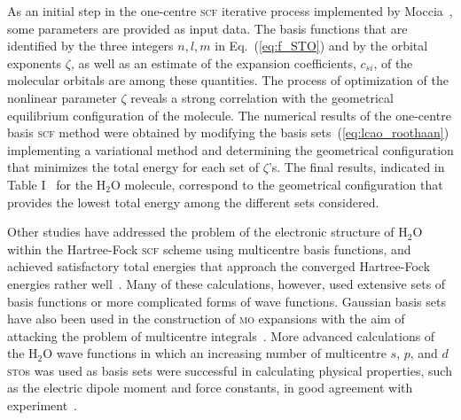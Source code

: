 
As an initial step in the one-centre \textsc{scf} iterative process
implemented by
Moccia~\cite{Moccia_JCP_2164,Moccia_JCP_2176,Moccia_1964}, some
parameters are provided as input data. The basis functions that are
identified by the three integers $n,l,m$ in Eq.~(\ref{eq:f_STO}) and
by the orbital exponents $\zeta$, as well as an estimate of the
expansion coefficients, $c_{si}$, of the molecular orbitals are among
these quantities. The process of optimization of the nonlinear
parameter $\zeta$ reveals a strong correlation with the geometrical
equilibrium configuration of the molecule. The numerical results of
the one-centre basis \textsc{scf} method were obtained by modifying
the basis sets~(\ref{eq:lcao_roothaan}) implementing a variational
method and determining the geometrical configuration that minimizes
the total energy for each set of $\zeta$'s. The final results,
indicated in Table I~\cite{Moccia_1964} for the H$_{2}$O molecule,
correspond to the geometrical configuration that provides the lowest
total energy among the different sets considered.








Other studies have addressed the problem of the electronic structure
of H$_{2}$O within the Hartree-Fock \textsc{scf} scheme using
multicentre basis functions, and achieved satisfactory total energies
that approach the converged Hartree-Fock energies rather
well~\cite{natureH2O_1960, gaussianH2O_1965,
  Moccia_oneCenterHF_1967,Reeves_nature_1956}. Many of these
calculations, however, used extensive sets of basis functions or more
complicated forms of wave functions. Gaussian basis sets have also
been used in the construction of \textsc{mo} expansions with the aim
of attacking the problem of multicentre
integrals~\cite{gaussianH2O_1965,Neumann_gaussian_1968}. More advanced
calculations of the H$_{2}$O wave functions in which an increasing
number of multicentre $s$, $p$, and $d$ \textsc{sto}s was used as
basis sets were successful in calculating physical properties, such as
the electric dipole moment and force constants, in good agreement with
experiment~\cite{Pitzer_1968,Pitzer_1970}.











